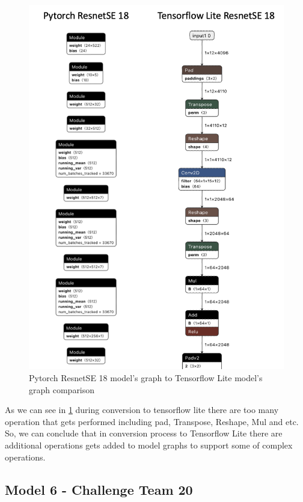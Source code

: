 \begin{figure}[H]
\centering
\includegraphics[scale=0.7]{img/resnetse_conversion_comparison.png}
\caption{Pytorch ResnetSE 18 model's graph to Tensorflow Lite model's graph comparison }
\label{resenet18_conversion_comparison}
\end{figure}

As we can see in \ref{resenet18_conversion_comparison} during conversion to tensorflow lite there are too many operation that gets performed including pad, Transpose, Reshape, Mul and etc. So, we can conclude that in conversion process to Tensorflow Lite there are additional operations gets added to model graphs to support some of complex operations. 


\subsection{Model 6 - Challenge Team 20}\label{5CTLM6}

